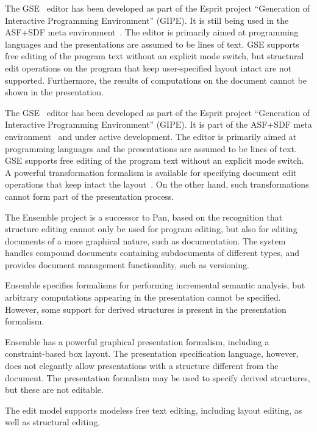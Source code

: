 \documentclass{speauth}
\begin{document}

\bc
The GSE~\cite{koorn92gse} editor has been developed as part of the Esprit project ``Generation of Interactive Programming Environment'' (GIPE). It is still being used in the ASF+SDF meta environment~\cite{klint93asfsdf}. The editor is primarily aimed at programming languages and the presentations are assumed to be lines of text. GSE supports free editing of the program text without an explicit mode switch, but structural edit operations on the program that keep user-specified layout intact are not supported. Furthermore, the results of computations on the document cannot be shown in the presentation. \ec

The GSE~\cite{koorn92gse} editor has been developed as part of the Esprit project ``Generation of Interactive Programming Environment'' (GIPE). It is part of the ASF+SDF meta environment~\cite{klint93asfsdf} and under active development. The editor is primarily aimed at programming languages and the presentations are assumed to be lines of text. GSE supports free editing of the program text without an explicit mode switch. A powerful transformation formalism is available for specifying document edit operations that keep intact the layout~\cite{brand00rewriteLayout}. On the other hand, such transformations cannot form part of the presentation process.


The Ensemble project is a successor to Pan, based on the recognition that structure editing cannot only be used for program editing, but also for editing documents of a more graphical nature, such as documentation. The system handles compound documents containing subdocuments of different types, and provides document management functionality, such as versioning.

Ensemble specifies formalisms for performing incremental semantic analysis, but arbitrary computations appearing in the presentation cannot be specified. However, some support for derived structures is present in the presentation formalism.

Ensemble has a powerful graphical presentation formalism, including a constraint-based box layout. The presentation specification language, however, does not elegantly allow presentations with a structure different from the document. The presentation formalism may be used to specify derived structures, but these are not editable.

The edit model supports modeless free text editing, including layout editing, as well as structural editing.
\end{document}
